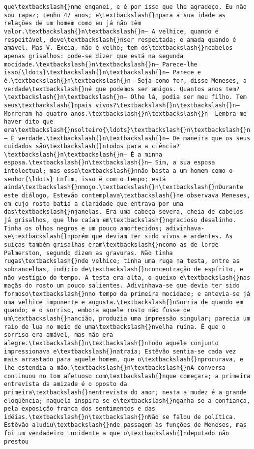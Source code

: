 \documentclass[11pt]{article}
\begin{document}
\begin{Verbatim}[commandchars=\\\{\}]
que\textbackslash{}nme enganei, e é por isso que lhe agradeço. Eu não sou rapaz; tenho 47 anos; e\textbackslash{}npara a sua idade as relações de um homem como eu já não têm valor.\textbackslash{}n\textbackslash{}n— A velhice, quando é respeitável, deve\textbackslash{}nser respeitada; e amada quando é amável. Mas V. Excia. não é velho; tem os\textbackslash{}ncabelos apenas grisalhos: pode-se dizer que está na segunda mocidade.\textbackslash{}n\textbackslash{}n— Parece-lhe isso{\ldots}\textbackslash{}n\textbackslash{}n— Parece e é.\textbackslash{}n\textbackslash{}n— Seja como for, disse Meneses, a verdade\textbackslash{}né que podemos ser amigos. Quantos anos tem?\textbackslash{}n\textbackslash{}n— Olhe lá, podia ser meu filho. Tem seus\textbackslash{}npais vivos?\textbackslash{}n\textbackslash{}n— Morreram há quatro anos.\textbackslash{}n\textbackslash{}n— Lembra-me haver dito que era\textbackslash{}nsolteiro{\ldots}\textbackslash{}n\textbackslash{}n— É verdade.\textbackslash{}n\textbackslash{}n— De maneira que os seus cuidados são\textbackslash{}ntodos para a ciência?\textbackslash{}n\textbackslash{}n— É a minha esposa.\textbackslash{}n\textbackslash{}n— Sim, a sua esposa intelectual; mas essa\textbackslash{}nnão basta a um homem como o senhor{\ldots} Enfim, isso é com o tempo; está ainda\textbackslash{}nmoço.\textbackslash{}n\textbackslash{}nDurante este diálogo, Estevão contemplava\textbackslash{}ne observava Meneses, em cujo rosto batia a claridade que entrava por uma das\textbackslash{}njanelas. Era uma cabeça severa, cheia de cabelos já grisalhos, que lhe caíam em\textbackslash{}ngracioso desalinho. Tinha os olhos negros e um pouco amortecidos; adivinhava-se\textbackslash{}nporém que deviam ter sido vivos e ardentes. As suíças também grisalhas eram\textbackslash{}ncomo as de lorde Palmerston, segundo dizem as gravuras. Não tinha rugas\textbackslash{}nde velhice; tinha uma ruga na testa, entre as sobrancelhas, indício de\textbackslash{}nconcentração de espírito, e não vestígio do tempo. A testa era alta, o queixo e\textbackslash{}nas maçãs do rosto um pouco salientes. Adivinhava-se que devia ter sido formoso\textbackslash{}nno tempo da primeira mocidade; e antevia-se já uma velhice imponente e augusta.\textbackslash{}nSorria de quando em quando; e o sorriso, embora aquele rosto não fosse de um\textbackslash{}nancião, produzia uma impressão singular; parecia um raio de lua no meio de uma\textbackslash{}nvelha ruína. É que o sorriso era amável, mas não era alegre.\textbackslash{}n\textbackslash{}nTodo aquele conjunto impressionava e\textbackslash{}natraía; Estêvão sentia-se cada vez mais arrastado para aquele homem, que o\textbackslash{}nprocurava, e lhe estendia a mão.\textbackslash{}n\textbackslash{}nA conversa continuou no tom afetuoso com\textbackslash{}nque começara; a primeira entrevista da amizade é o oposto da primeira\textbackslash{}nentrevista do amor; nesta a mudez é a grande eloqüência; naquela inspira-se e\textbackslash{}nganha-se a confiança, pela exposição franca dos sentimentos e das idéias.\textbackslash{}n\textbackslash{}nNão se falou de política. Estêvão aludiu\textbackslash{}nde passagem às funções de Meneses, mas foi um verdadeiro incidente a que o\textbackslash{}ndeputado não prestou 
\end{Verbatim}
\end{document}
